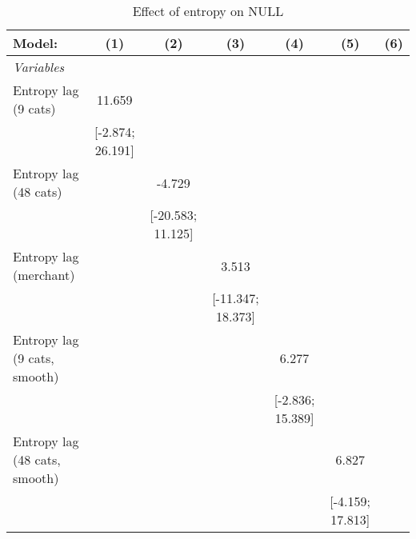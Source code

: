 
\begin{table}[htbp]
   \centering
   \tiny
   \begin{threeparttable}[b]
      \caption{\label{tab:reg_inflows_main} Effect of entropy on NULL}
      \begin{tabular}{lcccccc}
         \tabularnewline \midrule \midrule
         Model:                         & (1)                  & (2)                  & (3)                  & (4)                  & (5)                  & (6)\\  
         \midrule
         \emph{Variables}\\
         Entropy lag (9 cats)           & 11.659               &                      &                      &                      &                      &   \\   
                                        & [-2.874; 26.191]     &                      &                      &                      &                      &   \\   
         Entropy lag (48 cats)          &                      & -4.729               &                      &                      &                      &   \\   
                                        &                      & [-20.583; 11.125]    &                      &                      &                      &   \\   
         Entropy lag (merchant)         &                      &                      & 3.513                &                      &                      &   \\   
                                        &                      &                      & [-11.347; 18.373]    &                      &                      &   \\   
         Entropy lag (9 cats, smooth)   &                      &                      &                      & 6.277                &                      &   \\   
                                        &                      &                      &                      & [-2.836; 15.389]     &                      &   \\   
         Entropy lag (48 cats, smooth)  &                      &                      &                      &                      & 6.827                &   \\   
                                        &                      &                      &                      &                      & [-4.159; 17.813]     &   \\   

\end{tabular}
\end{threeparttable}
\end{table}
